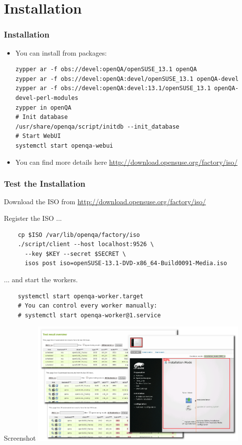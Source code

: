 \documentclass{beamer}
\begin{document}
\section{Installation}
%
%
\begin{frame}[fragile]
  \frametitle{Installation}
  \begin{itemize}
  \item You can install from packages:
    \lstset{style=mybash}
    \begin{lstlisting}
zypper ar -f obs://devel:openQA/openSUSE_13.1 openQA
zypper ar -f obs://devel:openQA:devel/openSUSE_13.1 openQA-devel
zypper ar -f obs://devel:openQA:devel:13.1/openSUSE_13.1 openQA-devel-perl-modules
zypper in openQA
# Init database
/usr/share/openqa/script/initdb --init_database
# Start WebUI
systemctl start openqa-webui
    \end{lstlisting}
  \item You can find more details here\newline
    \url{http://download.opensuse.org/factory/iso/}
  \end{itemize}
\end{frame}

%
%
\begin{frame}[fragile]
  \frametitle{Test the Installation}
  Download the ISO from
  \url{http://download.opensuse.org/factory/iso/}\newline

  Register the ISO ...
  \lstset{style=mybash}
  \begin{lstlisting}
    cp $ISO /var/lib/openqa/factory/iso
    ./script/client --host localhost:9526 \
      --key $KEY --secret $SECRET \
      isos post iso=openSUSE-13.1-DVD-x86_64-Build0091-Media.iso
  \end{lstlisting}

  ... and start the workers.
  \lstset{style=mybash}
  \begin{lstlisting}
    systemctl start openqa-worker.target
    # You can control every worker manually:
    # systemctl start openqa-worker@1.service
  \end{lstlisting}
\end{frame}

%
%
\begin{frame}{Screenshot}
  \includegraphics[height=6.2cm,width=10.88cm]{screenshot}
\end{frame}
\end{document}
